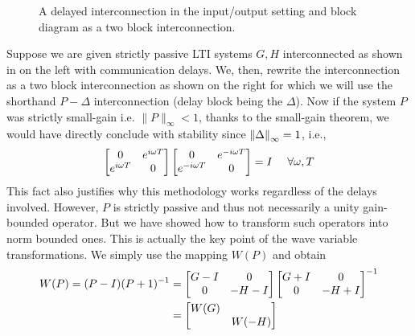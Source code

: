 \begin{figure}%
\centering
{}
\caption[A delayed interconnection]{A delayed interconnection in the input/output setting and 
block diagram as a two block interconnection.}%
\label{lit:syn:delinc}%
\end{figure}

Suppose we are given strictly passive LTI systems $G,H$ interconnected as shown in  on the 
left with communication delays. We, then, rewrite the interconnection as a two block interconnection as shown on 
the right for which we will use the shorthand $P-\Delta$ interconnection (delay block being the $\Delta$). Now if 
the system $P$ was strictly small-gain i.e. \(\|P\|_\infty< 1\),  thanks to the small-gain theorem, we would have 
directly conclude with stability since $\displaystyle \left\| \Delta \right\|_\infty = 1$, i.e.,
\[
\begin{bmatrix}0 &e^{i\omega T}\\e^{i\omega T}&0\end{bmatrix}\begin{bmatrix}0 &e^{-i\omega T}\\e^{-i\omega T}&0\end{bmatrix}= I \quad \ \forall\omega,T 
\]
This fact also justifies why this methodology works regardless of the delays involved. However, $P$ is strictly 
passive and thus not necessarily a unity gain-bounded operator. But we have showed how to transform 
such operators into norm bounded ones. This is actually the key point of the wave variable transformations. We 
simply use the mapping $W(P)$ and obtain 
\begin{align}
W(P) = (P-I)(P+1)^{-1} &= \begin{bmatrix}G-I & 0\\0 &-H-I\end{bmatrix}\begin{bmatrix}G+I & 0\\0 &-H+I\end{bmatrix}^{-1}\\ &= \begin{bmatrix}W(G) &\\&W(-H)\end{bmatrix}
\end{align}

